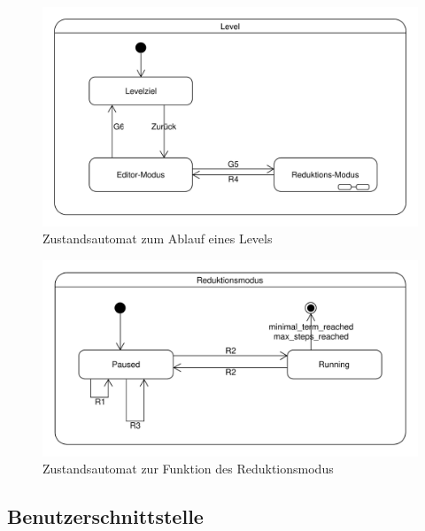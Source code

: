 \begin{figure}[H]
\centering
\includegraphics[scale=0.65]{../system_models/dynamic_models/game_level_state_machine.pdf}
\caption{Zustandsautomat zum Ablauf eines Levels}
\end{figure}

\begin{figure}[H]
\centering
\includegraphics[scale=0.67]{../system_models/dynamic_models/reduction_mode_state_machine.pdf}
\caption{Zustandsautomat zur Funktion des Reduktionsmodus}
\end{figure}

\subsection{Benutzerschnittstelle}
\label{gui_section}


